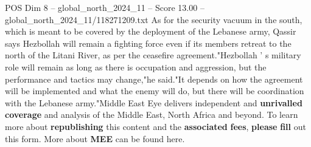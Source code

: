\begin{textsample}{POS Dim 8 – global\_north\_2024\_11 – Score 13.00 – global\_north\_2024\_11/118271209.txt}
As for the security vacuum in the south, which is meant to be covered by the deployment of the Lebanese army, Qassir says Hezbollah will remain a fighting force even if its members retreat to the north of the Litani River, as per the ceasefire agreement."Hezbollah ' s military role will remain as long as there is occupation and aggression, but the performance and tactics may change,"he said."It depends on how the agreement will be implemented and what the enemy will do, but there will be coordination with the Lebanese army."Middle East Eye delivers independent and \textbf{unrivalled} \textbf{coverage} and analysis of the Middle East, North Africa and beyond.
To learn more about \textbf{republishing} this content and the \textbf{associated} \textbf{fees}, \textbf{please} \textbf{fill} out this form.
More about \textbf{MEE} can be found here.

\end{textsample}
